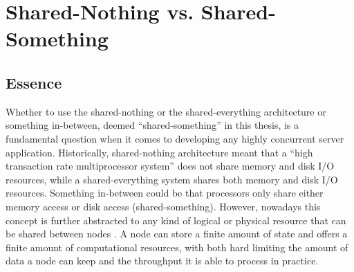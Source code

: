 \section{Shared-Nothing vs. Shared-Something}
\subsection{Essence}
Whether to use the shared-nothing or the shared-everything architecture or something in-between, deemed “shared-something” in this thesis, is a fundamental question when it comes to developing any highly concurrent server application. \newline
Historically, shared-nothing architecture meant that a “high transaction rate multiprocessor system” does not share memory and disk I/O resources, while a shared-everything system shares both memory and disk I/O resources. Something in-between could be that processors only share either memory access or disk access \cite{stonebraker:shared_nothing} (shared-something). However, nowadays this concept is further abstracted to any kind of logical or physical resource that can be shared between nodes \cite{wikipedia:shared_nothing}. A node can store a finite amount of state and offers a finite amount of computational resources, with both hard limiting the amount of data a node can keep and the throughput it is able to process in practice.
